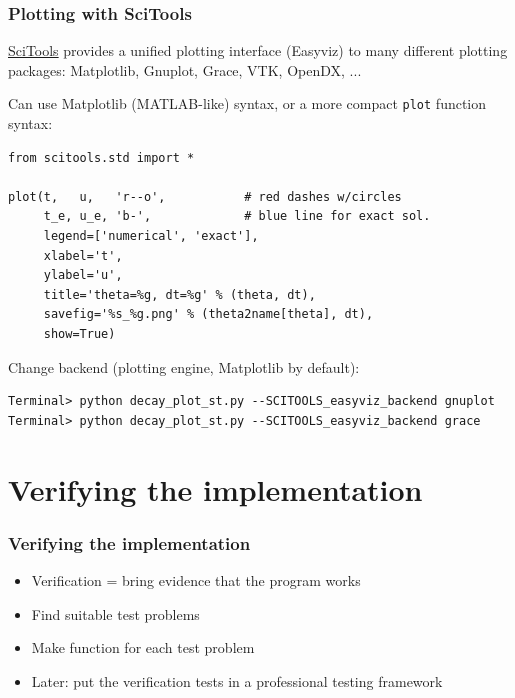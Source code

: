 \documentclass{beamer}
\begin{document}
\begin{frame}
\frametitle{Plotting with SciTools}

\href{{https://github.com/hplgit/scitools}}{SciTools} provides a
unified plotting interface (Easyviz) to many different plotting
packages: Matplotlib, Gnuplot, Grace, VTK, OpenDX, ...

Can use Matplotlib (MATLAB-like) syntax,
or a more compact \texttt{plot} function syntax:

\begin{verbatim}
from scitools.std import *

plot(t,   u,   'r--o',           # red dashes w/circles
     t_e, u_e, 'b-',             # blue line for exact sol.
     legend=['numerical', 'exact'],
     xlabel='t',
     ylabel='u',
     title='theta=%g, dt=%g' % (theta, dt),
     savefig='%s_%g.png' % (theta2name[theta], dt),
     show=True)
\end{verbatim}

Change backend (plotting engine, Matplotlib by default):

\begin{verbatim}
Terminal> python decay_plot_st.py --SCITOOLS_easyviz_backend gnuplot
Terminal> python decay_plot_st.py --SCITOOLS_easyviz_backend grace
\end{verbatim}
\end{frame}

\section{Verifying the implementation}

\begin{frame}
\frametitle{Verifying the implementation}

\label{decay:verification}


\begin{itemize}
 \item Verification = bring evidence that the program works

 \item Find suitable test problems

 \item Make function for each test problem

 \item Later: put the verification tests in a professional testing framework
\end{itemize}

\noindent

\end{frame}
\end{document}
